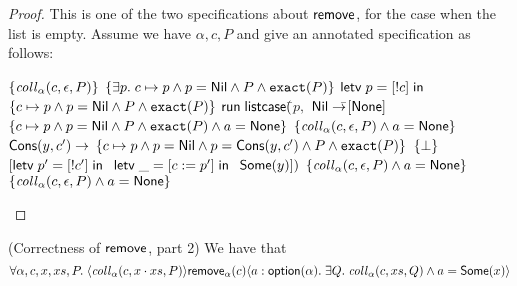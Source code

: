 \begin{proof}
  This is one of the two specifications about $\mathsf{remove}$, for the case
  when the list is empty. Assume we have $\alpha, c, P$ and give an annotated
  specification as follows: 

\begin{specification}
\nextline $\{{\mathit{coll}_\alpha(c, \epsilon, P)}\}$ 
\nextline $\{{\exists p.\; c \mapsto p \land p = \mathsf{Nil} \land P \land \mathtt{exact}({P})}\}$ 
\nextline $\mathsf{letv}\;p = [!c]\;\mathsf{in}\;$ 
\nextline $\{{c \mapsto p \land p = \mathsf{Nil} \land P \land \mathtt{exact}({P})}\}$ 
\nextline $\mathsf{run}\;\mathsf{listcase}($\=$p,$ 
\nextline \> $\mathsf{Nil} \to $\=$[\mathsf{None}]$ 
\nextline \> \> $\{{c \mapsto p \land p = \mathsf{Nil} \land P \land \mathtt{exact}({P}) \land a = \mathsf{None}}\}$ 
\nextline \> \> $\{{\mathit{coll}_\alpha(c, \epsilon, P) \land a = \mathsf{None}}\}$ 
\nextline \> $\mathsf{Cons}(y, c') \to $ 
\nextline \> \> $\{{c \mapsto p \land p = \mathsf{Nil} \land p = \mathsf{Cons}(y, c') \land P \land \mathtt{exact}({P})}\}$ 
\nextline \> \> $\{{\bot}\}$ 
\nextline \> \> $[\mathsf{letv}\;p' = [!c']\;\mathsf{in}\;$ 
\nextline \> \> $\mathsf{letv}\;\_ = [c := p']\;\mathsf{in}\;$ 
\nextline \> \> $\mathsf{Some}(y)])$
\nextline \> \> $\{{\mathit{coll}_\alpha(c, \epsilon, P) \land a = \mathsf{None}}\}$ 
\nextline $\{{\mathit{coll}_\alpha(c, \epsilon, P) \land a = \mathsf{None}}\}$ 
\end{specification}
\end{proof}

\begin{lemma}{(Correctness of $\mathsf{remove}$, part 2)}
We have that 
\begin{displaymath}
  \forall \alpha, c, x, xs, P.\; \langle{\mathit{coll}_\alpha(c, x\cdot xs, P)}\rangle{\mathsf{remove}_\alpha(c)}\langle{a:\mathsf{option }{(\alpha)}}.\;{\exists Q.\; \mathit{coll}_\alpha(c, xs, Q) 
                                       \land a = \mathsf{Some}(x)}\rangle
\end{displaymath}
\end{lemma}

